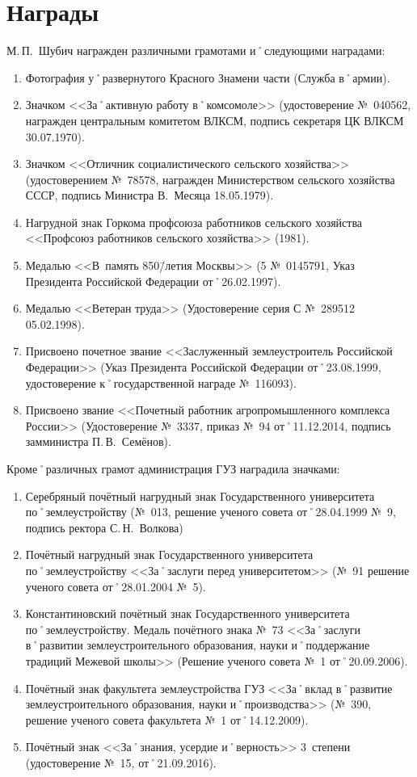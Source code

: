 ﻿\section{Награды}
\noindent М.\,П.~Шубич награжден различными грамотами и˚следующими наградами: 

\begin{enumerate}
	\item Фотография у˚развернутого Красного Знамени части (Служба в˚армии).
	\item Значком <<За˚активную работу в˚комсомоле>> (удостоверение №~040562, награжден центральным комитетом ВЛКСМ, подпись секретаря ЦК ВЛКСМ 30.07.1970).
	\item Значком <<Отличник социалистического сельского хозяйства>> (удостоверением №~78578, награжден Министерством сельского хозяйства СССР, подпись Министра В.~Месяца 18.05.1979).
	\item Нагрудной знак Горкома профсоюза работников сельского хозяйства <<Профсоюз работников сельского хозяйства>> (1981).
	\item Медалью <<В~память 850\=/летия Москвы>> (5 №~0145791, Указ Президента Российской Федерации от˚26.02.1997).
	\item Медалью <<Ветеран труда>> (Удостоверение серия С №~289512 05.02.1998).
	\item Присвоено почетное звание <<Заслуженный землеустроитель Российской Федерации>> (Указ Президента Российской Федерации от˚23.08.1999, удостоверение к˚государственной награде №~116093).
	\item Присвоено звание <<Почетный работник агропромышленного комплекса России>> (Удостоверение №~3337, приказ №~94 от˚11.12.2014, подпись замминистра П.\,В.~Семёнов).
\end{enumerate}

\noindent Кроме˚различных грамот администрация ГУЗ наградила значками:
\begin{enumerate}	
	\item Серебряный почётный нагрудный знак Государственного университета по˚землеустройству (№~013, решение ученого совета от˚28.04.1999 №~9, подпись ректора С.\,Н.~Волкова) 
	\item Почётный нагрудный знак Государственного университета по˚землеустройству <<За˚заслуги перед университетом>> (№~91 решение ученого совета от˚28.01.2004 №~5).
	\item Константиновский почётный знак Государственного университета по˚землеустройству. Медаль почётного знака №~73 <<За˚заслуги в˚развитии землеустроительного образования, науки и˚поддержание традиций Межевой школы>> (Решение ученого совета №~1 от˚20.09.2006).
	\item Почётный знак факультета землеустройства ГУЗ <<За˚вклад в˚развитие землеустроительного образования, науки и˚производства>> (№~390, решение ученого совета факультета №~1 от˚14.12.2009).
	\item Почётный знак <<За˚знания, усердие и˚верность>> 3~степени (удостоверение №~15, от˚21.09.2016). 
\end{enumerate}
